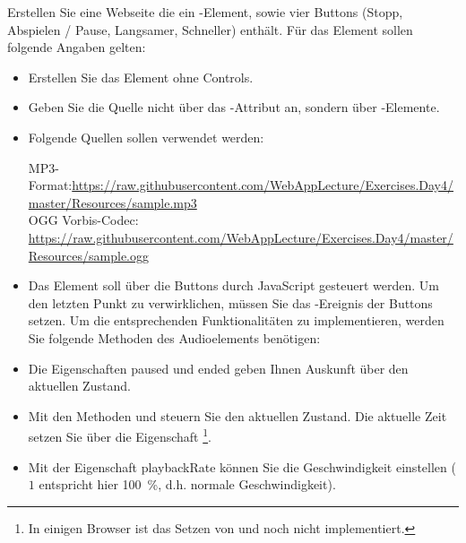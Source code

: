 %
\par Erstellen Sie eine Webseite die ein -Element, sowie vier
Buttons (Stopp, Abspielen / Pause, Langsamer, Schneller) enthält. Für das
Element sollen folgende Angaben gelten:
%
\begin{itemize}
\item
Erstellen Sie das Element ohne Controls.
\item
Geben Sie die Quelle nicht über das -Attribut an, sondern über
-Elemente.
\item
Folgende Quellen sollen verwendet werden:

MP3-Format:\url{https://raw.githubusercontent.com/WebAppLecture/Exercises.Day4/master/Resources/sample.mp3} \\
OGG Vorbis-Codec: \url{https://raw.githubusercontent.com/WebAppLecture/Exercises.Day4/master/Resources/sample.ogg}
\item
Das Element soll über die Buttons durch JavaScript gesteuert werden. Um den
letzten Punkt zu verwirklichen, müssen Sie das -Ereignis der
Buttons setzen. Um die entsprechenden Funktionalitäten zu implementieren, werden
Sie folgende Methoden des Audioelements benötigen:
\item
Die Eigenschaften paused und ended geben Ihnen Auskunft über den aktuellen
Zustand.
\item
Mit den Methoden  und  steuern Sie den aktuellen
Zustand. Die aktuelle Zeit setzen Sie über die Eigenschaft
\footnote{In einigen Browser ist das Setzen von
 und  noch nicht implementiert.}.
\item
Mit der Eigenschaft playbackRate können Sie die Geschwindigkeit einstellen
($1$ entspricht hier \qty{100}{\%}, d.h. normale Geschwindigkeit).
\end{itemize}